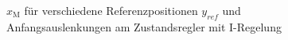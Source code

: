 \documentclass[
	pagesize,
	fontsize=12pt,
	paper=a4,
	oneside,
   reqno
]{scrartcl}
\begin{document}
\begin{figure}[H]
    \centering
    \caption[$x_{\mathrm{M}}$ für Regler mit I-Regelung]{$x_{\mathrm{M}}$ für verschiedene Referenzpositionen $y_{ref}$ und Anfangsauslenkungen am Zustandsregler mit I-Regelung}
    \label{fig:Bild19}
\end{figure}
\end{document}
